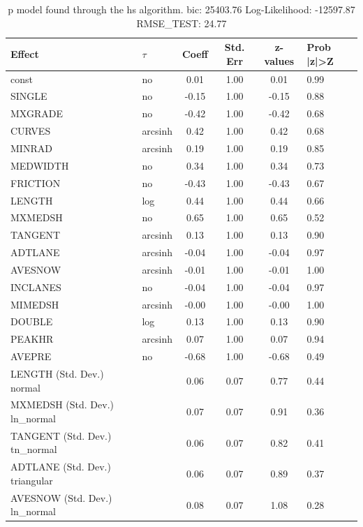 \begin{table}
	\caption{p model found through the hs algorithm. bic: 25403.76 Log-Likelihood: -12597.87 RMSE_TEST: 24.77}
	\begin{center}
		\begin{tabular}{|l|l|c|c|c|l|}
			\hline
			Effect & $\tau$ & Coeff & Std. Err & z-values & Prob |z|>Z \\
			\hline
			const & no & 0.01 & 1.00 & 0.01 & 0.99 \\
			\hline
			SINGLE & no & -0.15 & 1.00 & -0.15 & 0.88 \\
			\hline
			MXGRADE & no & -0.42 & 1.00 & -0.42 & 0.68 \\
			\hline
			CURVES & arcsinh & 0.42 & 1.00 & 0.42 & 0.68 \\
			\hline
			MINRAD & arcsinh & 0.19 & 1.00 & 0.19 & 0.85 \\
			\hline
			MEDWIDTH & no & 0.34 & 1.00 & 0.34 & 0.73 \\
			\hline
			FRICTION & no & -0.43 & 1.00 & -0.43 & 0.67 \\
			\hline
			LENGTH & log & 0.44 & 1.00 & 0.44 & 0.66 \\
			\hline
			MXMEDSH & no & 0.65 & 1.00 & 0.65 & 0.52 \\
			\hline
			TANGENT & arcsinh & 0.13 & 1.00 & 0.13 & 0.90 \\
			\hline
			ADTLANE & arcsinh & -0.04 & 1.00 & -0.04 & 0.97 \\
			\hline
			AVESNOW & arcsinh & -0.01 & 1.00 & -0.01 & 1.00 \\
			\hline
			INCLANES & no & -0.04 & 1.00 & -0.04 & 0.97 \\
			\hline
			MIMEDSH & arcsinh & -0.00 & 1.00 & -0.00 & 1.00 \\
			\hline
			DOUBLE & log & 0.13 & 1.00 & 0.13 & 0.90 \\
			\hline
			PEAKHR & arcsinh & 0.07 & 1.00 & 0.07 & 0.94 \\
			\hline
			AVEPRE & no & -0.68 & 1.00 & -0.68 & 0.49 \\
			\hline
			LENGTH (Std. Dev.) normal &  & 0.06 & 0.07 & 0.77 & 0.44 \\
			\hline
			MXMEDSH (Std. Dev.) ln_normal &  & 0.07 & 0.07 & 0.91 & 0.36 \\
			\hline
			TANGENT (Std. Dev.) tn_normal &  & 0.06 & 0.07 & 0.82 & 0.41 \\
			\hline
			ADTLANE (Std. Dev.) triangular &  & 0.06 & 0.07 & 0.89 & 0.37 \\
			\hline
			AVESNOW (Std. Dev.) ln_normal &  & 0.08 & 0.07 & 1.08 & 0.28 \\

\end{tabular}
\end{center}
\end{table}
